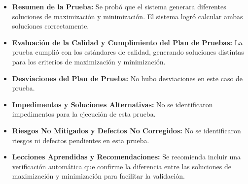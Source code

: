 \documentclass[stu, 12pt, letterpaper, donotrepeattitle, floatsintext, natbib]{apa7}
\begin{document}
\begin{itemize}
    \item \textbf{Resumen de la Prueba:} Se probó que el sistema generara diferentes soluciones de maximización y minimización. El sistema logró calcular ambas soluciones correctamente.
    
    \item \textbf{Evaluación de la Calidad y Cumplimiento del Plan de Pruebas:} La prueba cumplió con los estándares de calidad, generando soluciones distintas para los criterios de maximización y minimización.
    
    \item \textbf{Desviaciones del Plan de Prueba:} No hubo desviaciones en este caso de prueba.
    
    \item \textbf{Impedimentos y Soluciones Alternativas:} No se identificaron impedimentos para la ejecución de esta prueba.
    
    \item \textbf{Riesgos No Mitigados y Defectos No Corregidos:} No se identificaron riesgos ni defectos pendientes en esta prueba.
    
    \item \textbf{Lecciones Aprendidas y Recomendaciones:} Se recomienda incluir una verificación automática que confirme la diferencia entre las soluciones de maximización y minimización para facilitar la validación.
\end{itemize}
\end{document}
